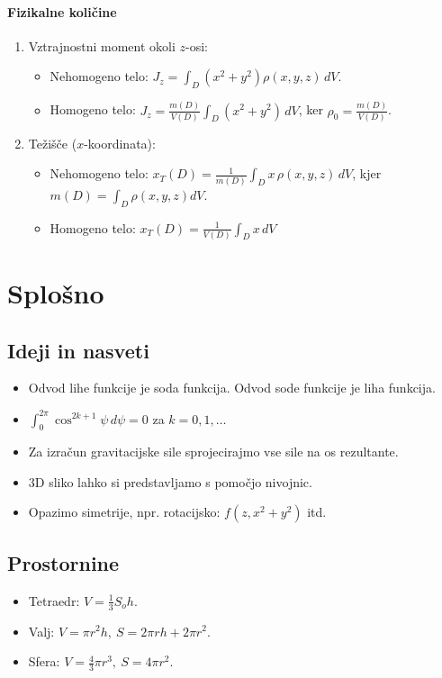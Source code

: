 \paragraph{Fizikalne količine}
\begin{enumerate}
    \item Vztrajnostni moment okoli \(z\)-osi:
    \begin{itemize}
        \item Nehomogeno telo: \(J_z = \int_D (x^2+y^2) \rho(x,y,z) \, dV\).
        \item Homogeno telo: \(J_z = \frac{m(D)}{V(D)} \int_D (x^2+y^2) \, dV\), ker \(\rho_0 = \frac{m(D)}{V(D)}\).
    \end{itemize}
    \item Težišče (\(x\)-koordinata):
    \begin{itemize}
        \item Nehomogeno telo: \(x_T(D) = \frac{1}{m(D)} \int_D x \, \rho(x,y,z) \, dV \), kjer \(m(D) = \int_D \rho(x,y,z) dV\).
        \item Homogeno telo: \(x_T(D) = \frac{1}{V(D)} \int_D x \, dV \)
    \end{itemize}
\end{enumerate}

\section{Splošno}
\subsection{Ideji in nasveti}
\begin{itemize}
    \item Odvod lihe funkcije je soda funkcija. Odvod sode funkcije je liha funkcija.
    \item \(\int_{0}^{2 \pi} \cos^{2k+1} \psi \, d \psi = 0\) za \(k = 0, 1, \ldots\)
    \item Za izračun gravitacijske sile sprojecirajmo vse sile na os rezultante.
    \item 3D sliko lahko si predstavljamo s pomočjo nivojnic.
    \item Opazimo simetrije, npr. rotacijsko: \(f(z, x^2+y^2)\) itd.
\end{itemize}

\subsection{Prostornine}
\begin{itemize}
    \item Tetraedr: \(V = \frac{1}{3}S_{o} h\).
    \item Valj: \(V = \pi r^2 h, \ S = 2\pi rh+2\pi r^2\).
    \item Sfera: \(V = \frac{4}{3} \pi r^3, \ S = 4 \pi r^2\).
\end{itemize}

